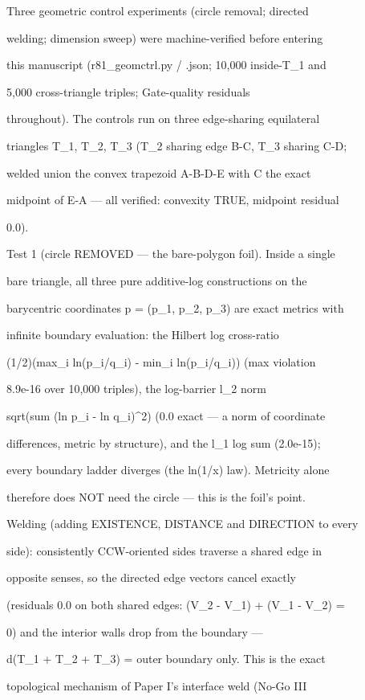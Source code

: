 \documentclass[11pt,a4paper]{article}
\theoremstyle{definition}
\begin{document}
Three geometric control experiments (circle removal; directed

welding; dimension sweep) were machine-verified before entering

this manuscript (r81\_geomctrl.py / .json; 10,000 inside-T\_1 and

5,000 cross-triangle triples; Gate-quality residuals

throughout). The controls run on three edge-sharing equilateral

triangles T\_1, T\_2, T\_3 (T\_2 sharing edge B-C, T\_3 sharing C-D;

welded union the convex trapezoid A-B-D-E with C the exact

midpoint of E-A — all verified: convexity TRUE, midpoint residual

0.0).


Test 1 (circle REMOVED — the bare-polygon foil). Inside a single

bare triangle, all three pure additive-log constructions on the

barycentric coordinates p = (p\_1, p\_2, p\_3) are exact metrics with

infinite boundary evaluation: the Hilbert log cross-ratio

(1/2)(max\_i ln(p\_i/q\_i) - min\_i ln(p\_i/q\_i)) (max violation

8.9e-16 over 10,000 triples), the log-barrier l\_2 norm

sqrt(sum (ln p\_i - ln q\_i)\^{}2) (0.0 exact — a norm of coordinate

differences, metric by structure), and the l\_1 log sum (2.0e-15);

every boundary ladder diverges (the ln(1/x) law). Metricity alone

therefore does NOT need the circle — this is the foil's point.


Welding (adding EXISTENCE, DISTANCE and DIRECTION to every

side): consistently CCW-oriented sides traverse a shared edge in

opposite senses, so the directed edge vectors cancel exactly

(residuals 0.0 on both shared edges: (V\_2 - V\_1) + (V\_1 - V\_2) =

0) and the interior walls drop from the boundary —

d(T\_1 + T\_2 + T\_3) = outer boundary only. This is the exact

topological mechanism of Paper I's interface weld (No-Go III
\end{document}
